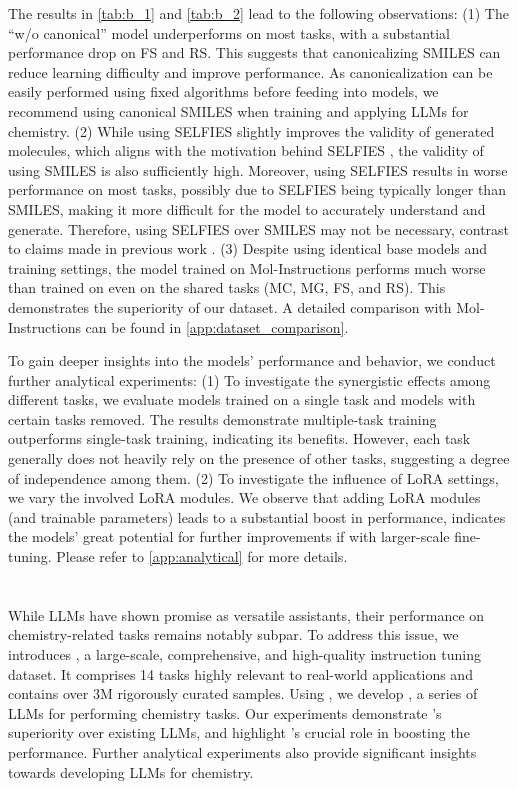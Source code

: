 The results in \cref{tab:b_1} and \cref{tab:b_2} lead to the following observations: 
(1) The ``w/o canonical'' model underperforms \modelnamem on most tasks, with a substantial performance drop on FS and RS. This suggests that canonicalizing SMILES can reduce learning difficulty and improve performance. As canonicalization can be easily performed using fixed algorithms before feeding into models, we recommend using canonical SMILES when training and applying LLMs for chemistry.
(2) While using SELFIES slightly improves the validity of generated molecules, which aligns with the motivation behind SELFIES \citep{krenn2019selfies}, the validity of using SMILES is also sufficiently high. Moreover, using SELFIES results in worse performance on most tasks, possibly due to SELFIES being typically longer than SMILES, making it more difficult for the model to accurately understand and generate. Therefore, using SELFIES over SMILES may not be necessary, contrast to claims made in previous work \citep{krenn2019selfies,fang2023mol}. 
(3) Despite using identical base models and training settings, the model trained on Mol-Instructions \citep{fang2023mol} performs much worse than \modelnamem trained on \datasetname  even on the shared tasks (MC, MG, FS, and RS). This demonstrates the superiority of our dataset. A detailed comparison with Mol-Instructions can be found in \cref{app:dataset_comparison}.

To gain deeper insights into the models' performance and behavior, we conduct further analytical experiments:
(1) To investigate the synergistic effects among different tasks, we evaluate models trained on a single task and models with certain tasks removed.
The results demonstrate multiple-task training outperforms single-task training, indicating its benefits. However, each task generally does not heavily rely on the presence of other tasks, suggesting a degree of independence among them.
(2) To investigate the influence of LoRA \citep{hu2021lora} settings, we vary the involved LoRA modules. We observe that adding LoRA modules (and trainable parameters) leads to a substantial boost in performance, indicates the models' great potential for further improvements if with larger-scale fine-tuning.
Please refer to \cref{app:analytical} for more details.

\section{}
While LLMs have shown promise as versatile assistants, their performance on chemistry-related tasks remains notably subpar. 
To address this issue, we introduces \datasetname, a large-scale, comprehensive, and high-quality instruction tuning dataset. It comprises 14 tasks highly relevant to real-world applications and contains over 3M rigorously curated samples. 
Using \datasetname, we develop \modelname, a series of LLMs for performing chemistry tasks.
Our experiments demonstrate \modelname's superiority over existing LLMs, and highlight \datasetname's crucial role in boosting the performance.
Further analytical experiments also provide significant insights towards developing LLMs for chemistry.

